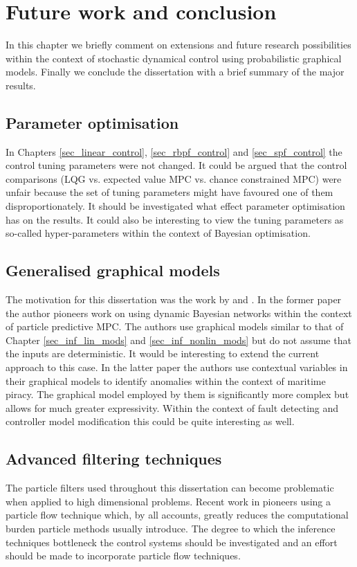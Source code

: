 \chapter{Future work and conclusion}
In this chapter we briefly comment on extensions and future research possibilities within the context of stochastic dynamical control using probabilistic graphical models. Finally we conclude the dissertation with a brief summary of the major results.

\section{Parameter optimisation}
In Chapters \ref{sec_linear_control}, \ref{sec_rbpf_control} and \ref{sec_spf_control} the control tuning parameters were not changed. It could be argued that the control comparisons (LQG vs. expected value MPC vs. chance constrained MPC) were unfair because the set of tuning parameters might have favoured one of them disproportionately. It should be investigated what effect parameter optimisation has on the results. It could also be interesting to view the tuning parameters as so-called hyper-parameters within the context of Bayesian optimisation. 

\section{Generalised graphical models}
The motivation for this dissertation was the work by \cite{devilliers} and \cite{dabrowski}. In the former paper the author pioneers work on using dynamic Bayesian networks within the context of particle predictive MPC. The authors use graphical models similar to that of Chapter \ref{sec_inf_lin_mods} and \ref{sec_inf_nonlin_mods} but do not assume that the inputs are deterministic. It would be interesting to extend the current approach to this case. In the latter paper the authors use contextual variables in their graphical models to identify anomalies within the context of maritime piracy. The graphical model employed by them is significantly more complex but allows for much greater expressivity. Within the context of fault detecting and controller model modification this could be quite interesting as well.

\section{Advanced filtering techniques}
The particle filters used throughout this dissertation can become problematic when applied to high dimensional problems. Recent work in \cite{daum} pioneers using a particle flow technique which, by all accounts, greatly reduces the computational burden particle methods usually introduce. The degree to which the inference techniques bottleneck the control systems should be investigated and an effort should be made to incorporate particle flow techniques. 

